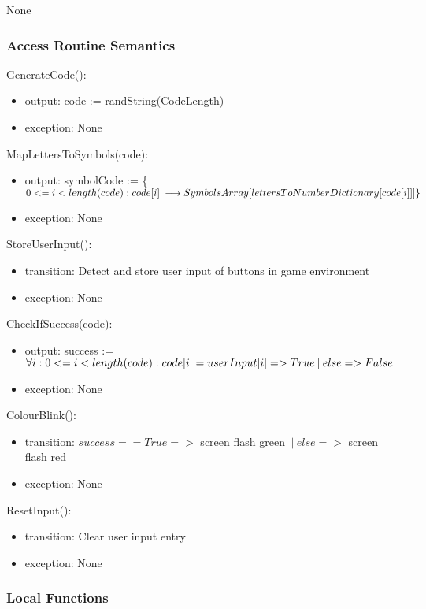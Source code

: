 \documentclass[12pt, titlepage]{article}
\begin{document}
None

\subsubsection{Access Routine Semantics}

\noindent GenerateCode():
\begin{itemize}
\item output: code := randString(CodeLength)
\item exception: None
\end{itemize}

\noindent MapLettersToSymbols(code):
\begin{itemize}
\item output: symbolCode :=  \{$0 <= i < length(code)   :   \newline code[i] \: \longrightarrow SymbolsArray[lettersToNumberDictionary[code[i]]]\}$
\item exception: None
\end{itemize}

\noindent StoreUserInput():
\begin{itemize}
\item transition: Detect and store user input of buttons in game environment
\item exception: None
\end{itemize}


\noindent CheckIfSuccess(code):
\begin{itemize}
\item output: success := $ \forall i: 0 <= i < length(code) : \newline code[i] = userInput[i] => True  \: | \: else => False$
\item exception: None
\end{itemize}

\noindent ColourBlink():
\begin{itemize}
\item transition: $success == True =>$ screen flash green $\: | \: else =>$ screen flash red
\item exception: None
\end{itemize}

\noindent ResetInput():
\begin{itemize}
\item transition: Clear user input entry
\item exception: None
\end{itemize}


\subsubsection{Local Functions}
\end{document}

